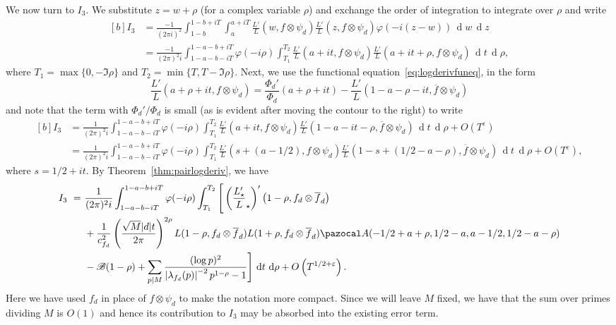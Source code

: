 \documentclass[11pt,reqno]{amsart} \usepackage{fullpage}
\newcommand{\vep}{\varepsilon}
\renewcommand{\d}[1]{\,\operatorname*{d}\!{#1}}
\newcommand\be{\begin{equation}}
\newcommand\ee{\end{equation}}
\newcommand{\gf}{\Phi_d}
\newcommand{\Lunram}{L_{\star}}
\numberwithin{equation}{section}
\begin{document}
We now turn to $I_3$. We substitute $z=w+\rho$ (for a complex variable $\rho$) and exchange
the order of integration to integrate over $\rho$ and write
\be\begin{aligned}[b]
  I_3&=\frac{-1}{(2\pi i)^2}\int_{1-b}^{1-b+iT}\int_a^{a+iT}\frac{L'}{L}(w,f\otimes\psi_d)
  \frac{L'}{L}(z,f\otimes\psi_d)\varphi(-i(z-w))\d w\d z \\
  &=\frac{-1}{(2\pi)^2i}\int_{1-a-b-iT}^{1-a-b+iT}\varphi(-i\rho)
  \int_{T_1}^{T_2}\frac{L'}{L}(a+it,f\otimes\psi_d)
  \frac{L'}{L}(a+it+\rho,f\otimes\psi_d)\d t\d\rho,
\end{aligned}\ee
where $T_1=\max\{0,-\Im\rho\}$ and $T_2=\min\{T,T-\Im\rho\}$.
Next, we use the functional equation~\eqref{eq:logderivfuneq}, in the form
\be\frac{L'}{L}(a+\rho+it,f\otimes\psi_d)=\frac{\gf'}{\gf}(a+\rho+it)
-\frac{L'}{L}(1-a-\rho-it,\overline f\otimes\psi_d)\ee and note that the term with
$\gf'/\gf$ is small (as is evident after moving the contour to the right) to write
\be\begin{aligned}[b]
  I_3&=\frac{1}{(2\pi)^2i}\int_{1-a-b-iT}^{1-a-b+iT}\varphi(-i\rho)
  \int_{T_1}^{T_2}\frac{L'}{L}(a+it,f\otimes\psi_d)
  \frac{L'}{L}(1-a-it-\rho,\overline f\otimes\psi_d)\d t\d\rho+O\left(T^\vep\right) \\
  &=\frac{1}{(2\pi)^2i}\int_{1-a-b-iT}^{1-a-b+iT}\varphi(-i\rho)
  \int_{T_1}^{T_2}\frac{L'}{L}(s+(a-1/2),f\otimes\psi_d)
  \frac{L'}{L}(1-s+(1/2-a-\rho),\overline f\otimes\psi_d)\d t\d\rho+O\left(T^\vep\right),
\end{aligned}\ee
where $s=1/2+it$. By Theorem~\ref{thm:pairlogderiv}, we have
\be\label{eq:I3postsub}\begin{aligned}[b]
  I_3\ = \ &
  \frac{1}{(2\pi)^2i}\int_{1-a-b-iT}^{1-a-b+iT}\varphi(-i\rho)
  \int_{T_1}^{T_2}\Bigg[
  \left(\frac{\Lunram'}\Lunram\right)'\left(1-\rho,f_d\otimes\overline f_d\right) \\
  &+\frac{1}{c_{f_d}^2}
  \left(\frac{\sqrt M|d|t}{2\pi}\right)^{2\rho}
  L(1-\rho,f_d\otimes\overline f_d)L(1+\rho,f_d\otimes\overline f_d)
  \pazocal A(-1/2+a+\rho,1/2-a,a-1/2,1/2-a-\rho) \\
  &-\mathcal B(1-\rho)+\sum_{p\mid M}\frac{(\log p)^2}
  {\left|\lambda_{f_d}(p)\right|^{-2}p^{1-\rho}-1}\Bigg]\d t\d\rho
  +O\left(T^{1/2+\vep}\right).
\end{aligned}\ee
Here we have used $f_d$ in place of $f\otimes\psi_d$ to make the notation more compact.
Since we will leave $M$ fixed, we have that the sum over primes dividing $M$ is $O(1)$ and
hence its contribution to $I_3$ may be absorbed into the existing error term.
\end{document}
